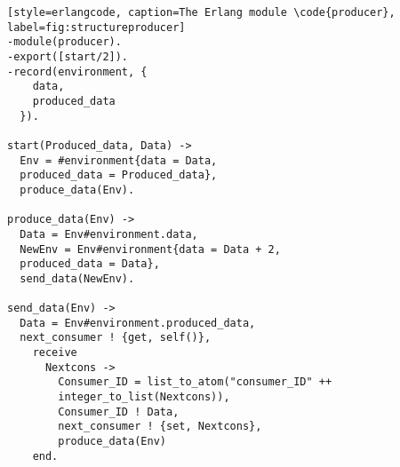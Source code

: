 \begin{verbatim}[style=erlangcode, caption=The Erlang module \code{producer}, label=fig:structureproducer]
-module(producer).
-export([start/2]).
-record(environment, {
    data,
    produced_data
  }).

start(Produced_data, Data) ->  
  Env = #environment{data = Data,
  produced_data = Produced_data},
  produce_data(Env).

produce_data(Env) ->
  Data = Env#environment.data,
  NewEnv = Env#environment{data = Data + 2,
  produced_data = Data},
  send_data(NewEnv).
   
send_data(Env) ->  
  Data = Env#environment.produced_data,
  next_consumer ! {get, self()},
    receive 
      Nextcons -> 
        Consumer_ID = list_to_atom("consumer_ID" ++
        integer_to_list(Nextcons)),
        Consumer_ID ! Data,
        next_consumer ! {set, Nextcons},
        produce_data(Env)
    end.
\end{verbatim}
